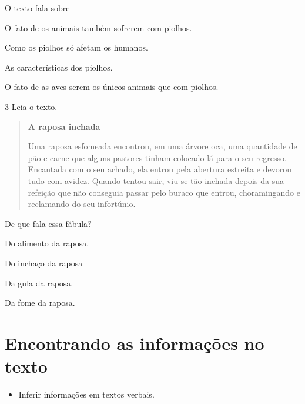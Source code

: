 O texto fala sobre

\begin{escolha}
\item O fato de os animais também sofrerem com piolhos.

\item Como os piolhos só afetam os humanos.

\item As características dos piolhos.

\item O fato de as aves serem os únicos animais que com piolhos.
\end{escolha}


\num{3} Leia o texto.

\begin{quote}
\textbf{A raposa inchada}

Uma raposa esfomeada encontrou, em uma árvore oca, uma quantidade de pão e
carne que alguns pastores tinham colocado lá para o seu regresso.
Encantada com o seu achado, ela entrou pela abertura estreita e devorou
tudo com avidez. Quando tentou sair, viu-se tão inchada depois da sua
refeição que não conseguia passar pelo buraco que entrou, choramingando e reclamando do seu infortúnio.

\end{quote}

De que fala essa fábula?

\begin{escolha}
\item Do alimento da raposa.

\item Do inchaço da raposa

\item Da gula da raposa.

\item Da fome da raposa.
\end{escolha}

\chapter[Encontrando as informações no texto]{\Large Encontrando as informações no texto}


\begin{itemize}
\item
Inferir informações em textos verbais.
\end{itemize}

